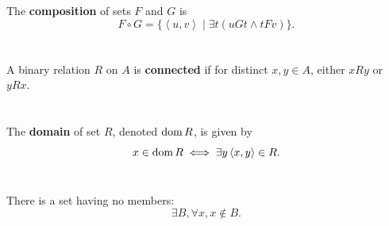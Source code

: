 \documentclass{report}
\newcommand{\pair}[1]{\left< #1 \right>}
\begin{document}
The \textbf{composition} of sets $F$ and $G$ is
  $$F \circ G = \{\pair{u, v} \mid \exists t(uGt \land tFv)\}.$$

\begin{definition}

  \statementpadding



\end{definition}

\section{}%

A binary relation $R$ on $A$ is \textbf{connected} if for distinct $x, y \in A$,
  either $xRy$ or $yRx$.

\begin{definition}


\end{definition}

\section{}%

The \textbf{domain} of set $R$, denoted $\mathop{\text{dom}}{R}$, is given by
  $$x \in \dom{R} \iff \exists y \pair{x, y} \in R.$$

\begin{definition}

  \statementpadding



\end{definition}

\section{}%

There is a set having no members:
  $$\exists B, \forall x, x \not\in B.$$

\begin{axiom}


\end{axiom}
\end{document}
